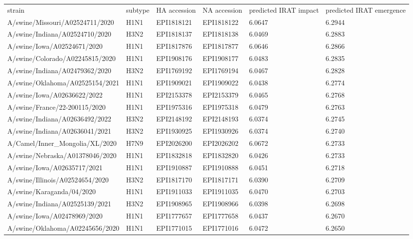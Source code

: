 \begin{tabular}{L{1.95in}|L{.25in}|L{.60in}|L{.6in}|C{1in}|C{1in}}\hline
strain&subtype& HA  accession & NA  accession & predicted  IRAT  impact & predicted  IRAT  emergence \\
 A/swine/Missouri/A02524711/2020 &H1N1&EPI1818121&EPI1818122&6.0647&6.2944\\
 A/swine/Indiana/A02524710/2020 &H3N2&EPI1818137&EPI1818138&6.0469&6.2883\\
 A/swine/Iowa/A02524671/2020 &H1N1&EPI1817876&EPI1817877&6.0646&6.2866\\
 A/swine/Colorado/A02245815/2020 &H1N1&EPI1908176&EPI1908177&6.0483&6.2835\\
 A/swine/Indiana/A02479362/2020 &H3N2&EPI1769192&EPI1769194&6.0467&6.2828\\
 A/swine/Oklahoma/A02525154/2021 &H1N1&EPI1909021&EPI1909022&6.0438&6.2774\\
 A/swine/Iowa/A02636622/2022 &H1N1&EPI2153378&EPI2153379&6.0465&6.2768\\
 A/swine/France/22-200115/2020 &H1N1&EPI1975316&EPI1975318&6.0479&6.2763\\
 A/swine/Indiana/A02636492/2022 &H3N2&EPI2148192&EPI2148193&6.0374&6.2745\\
 A/swine/Indiana/A02636041/2021 &H3N2&EPI1930925&EPI1930926&6.0374&6.2740\\
 A/Camel/Inner\_Mongolia/XL/2020 &H7N9&EPI2026200&EPI2026202&6.0672&6.2733\\
 A/swine/Nebraska/A01378046/2020 &H1N1&EPI1832818&EPI1832820&6.0426&6.2733\\
 A/swine/Iowa/A02635717/2021 &H1N1&EPI1910887&EPI1910888&6.0451&6.2718\\
 A/swine/Illinois/A02524654/2020 &H3N2&EPI1817170&EPI1817171&6.0390&6.2709\\
 A/swine/Karaganda/04/2020 &H1N1&EPI1911033&EPI1911035&6.0470&6.2703\\
 A/swine/Indiana/A02525139/2021 &H3N2&EPI1908965&EPI1908966&6.0398&6.2698\\
 A/swine/Iowa/A02478969/2020 &H1N1&EPI1777657&EPI1777658&6.0437&6.2670\\
 A/swine/Oklahoma/A02245656/2020 &H1N1&EPI1771015&EPI1771016&6.0472&6.2650\\

\end{tabular}
